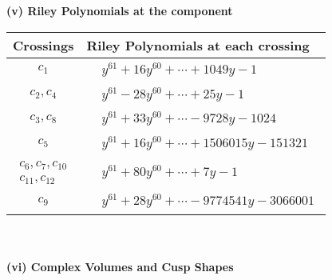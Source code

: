\documentclass[1p]{elsarticle_modified}
\theoremstyle{definition}
\begin{document}
\newpage\renewcommand{\arraystretch}{1}
\flushleft \textbf{(v) Riley Polynomials at the component}\newline \\
\begin{tabular}{m{50pt}|m{274pt}}
Crossings & \hspace{64pt}Riley Polynomials at each crossing \\
\hline $$\begin{aligned}c_{1}\end{aligned}$$&$\begin{aligned}
&y^{61}+16 y^{60}+\cdots+1049 y-1
\end{aligned}$\\
\hline $$\begin{aligned}c_{2},c_{4}\end{aligned}$$&$\begin{aligned}
&y^{61}-28 y^{60}+\cdots+25 y-1
\end{aligned}$\\
\hline $$\begin{aligned}c_{3},c_{8}\end{aligned}$$&$\begin{aligned}
&y^{61}+33 y^{60}+\cdots-9728 y-1024
\end{aligned}$\\
\hline $$\begin{aligned}c_{5}\end{aligned}$$&$\begin{aligned}
&y^{61}+16 y^{60}+\cdots+1506015 y-151321
\end{aligned}$\\
\hline $$\begin{aligned}c_{6},c_{7},c_{10}\\c_{11},c_{12}\end{aligned}$$&$\begin{aligned}
&y^{61}+80 y^{60}+\cdots+7 y-1
\end{aligned}$\\
\hline $$\begin{aligned}c_{9}\end{aligned}$$&$\begin{aligned}
&y^{61}+28 y^{60}+\cdots-9774541 y-3066001
\end{aligned}$\\
\hline
\end{tabular}\\~\\
\newpage\flushleft \textbf{(vi) Complex Volumes and Cusp Shapes}
\end{document}
